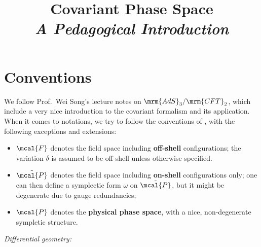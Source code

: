 \documentclass[a4paper
	,10pt
]{article}
\title{Covariant Phase Space\\\large\it A Pedagogical Introduction}
\begin{document}
\maketitle
{}
\thispagestyle{empty}


\setlength{\parskip}{.1\baselineskip}
\tableofcontents
\setlength{\parskip}{\parskipnorm}

\addtocounter{section}{-1}
\section{Conventions}
	We follow Prof.~Wei Song's lecture notes on $\mrm{AdS}_3/\mrm{CFT}_2$, which include a very nice introduction to the covariant formalism and its application. 
	When it comes to notations, we try to follow the conventions of \textcite{Harlow:2019yfa}, with the following exceptions and extensions: 
	
	\begin{itemize}
	\item $\mcal{F}$ denotes the field space including \textbf{off-shell} configurations; the variation $\delta$ is assumed to be off-shell unless otherwise specified.
	
	\item $\tilde{\mcal{P}}$ denotes the field space including \textbf{on-shell} configurations only; one can then define a symplectic form $\omega$ on $\tilde{\mcal{P}}$, but it might be degenerate due to gauge redundancies;
	
	\item $\mcal{P}$ denotes the \textbf{physical phase space}, with a nice, non-degenerate sympletic structure. 
	
	\end{itemize}
\smallskip
\textit{Differential geometry:}
	
\end{document}

